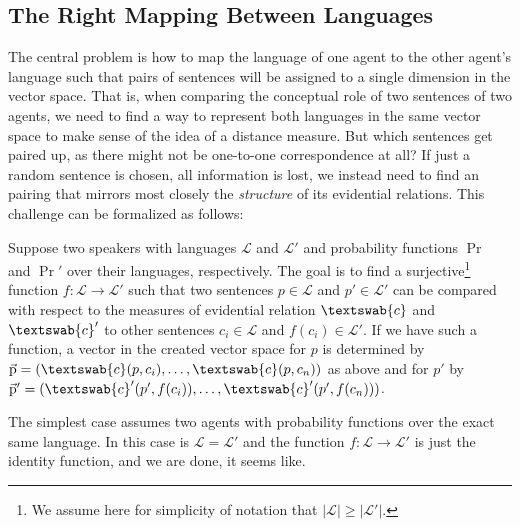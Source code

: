 \documentclass[11pt, a4paper]{scrartcl}
\renewcommand{\i}[1]{\emph{#1}}
\renewcommand{\L}{\mathcal{L}}
\renewcommand{\v}[1]{\vec{\mathrm{#1}}}
\newcommand{\m}[1]{\textswab{#1}}
\begin{document}
\subsection{The Right Mapping Between Languages}

The central problem is how to map the language of one agent to the other agent's language such that pairs of sentences will be assigned to a single dimension in the vector space. That is, when comparing the conceptual role of two sentences of two agents, we need to find a way to represent both languages in the same vector space to make sense of the idea of a distance measure. But which sentences get paired up, as there might not be one-to-one correspondence at all? If just a random sentence is chosen, all information is lost, we instead need to find an pairing that mirrors most closely the \i{structure} of its evidential relations. This challenge can be formalized as follows:

Suppose two speakers with languages $\L$ and $\L'$ and probability functions $\Pr$ and $\Pr'$ over their languages, respectively. The goal is to find a surjective\footnote{We assume here for simplicity of notation that $|\L| \geqslant |\L'|$.} function ${f: \L \rightarrow \L'}$ such that two sentences $p \in \L$ and $p' \in \L'$ can be compared with respect to the measures of evidential relation $\m{c}$ and $\m{c}'$ to other sentences $c_i \in \L$ and $f(c_i) \in \L'$. If we have such a function, a vector in the created vector space for $p$ is determined by $\v{p} = (\m{c}(p,c_i),\ldots,\m{c}(p,c_n))$ as above and for $p'$ by $\v{p}' = (\m{c}'(p',f(c_i)),\ldots,\m{c}'(p',f(c_n)))$. 

The simplest case assumes two agents with probability functions over the exact same language. In this case is $\L = \L'$ and the function $f: \L \rightarrow \L'$ is just the identity function, and we are done, it seems like.
\end{document}
